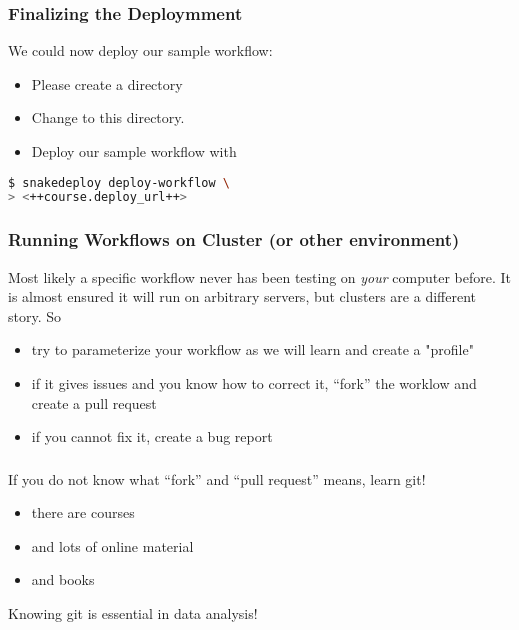 \begin{frame}[fragile]
	\frametitle{Finalizing the Deploymment}

		We could now deploy our sample workflow:
		\begin{itemize}
			\item Please create a directory 
			\item Change to this directory.
			\item Deploy our sample workflow with
		\end{itemize}
        \begin{lstlisting}[language=Bash, style=Shell]
$ snakedeploy deploy-workflow \
> <++course.deploy_url++>
       \end{lstlisting}
\end{frame}


\begin{frame}[fragile]
  \frametitle{Running Workflows on Cluster (or other environment)}
  Most likely a specific workflow never has been testing on \emph{your} computer before. It is almost ensured it will run on arbitrary servers, but clusters are a different story. \newline
  So
  \begin{itemize}[<+->]
   \item try to parameterize your workflow as we will learn and create a "profile"
   \item if it gives issues and you know how to correct it, ``fork'' the worklow and create a pull request
   \item if you cannot fix it, create a bug report
  \end{itemize}
\end{frame}

\begin{frame}
  \frametitle{}
  If you do not know what ``fork'' and ``pull request'' means, learn git!
  \begin{itemize}[<+->]
   \item there are courses
   \item and lots of online material
   \item and books
  \end{itemize}
  \pause
  \begin{warning}
  	Knowing git is essential in data analysis!
  \end{warning}
\end{frame}

